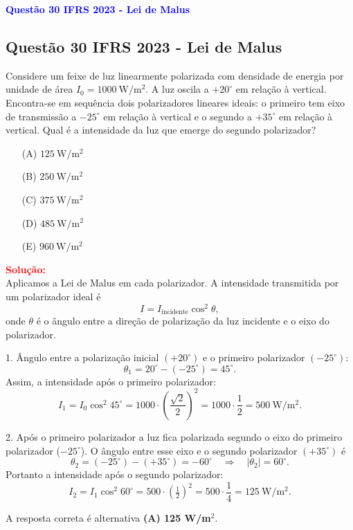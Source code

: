 \begin{flushleft}
\textbf{\textcolor{blue}{\Large Quest\~ao 30 IFRS 2023 - Lei de Malus}}\\
\noindent

\subsection{Quest\~ao 30 IFRS 2023 - Lei de Malus}

Considere um feixe de luz linearmente polarizada com densidade de energia por unidade de área \(I_0=1000\ \mathrm{W/m^2}\). 
A luz oscila a \(+20^\circ\) em relação à vertical. Encontra-se em sequência dois polarizadores lineares ideais: o primeiro 
tem eixo de transmissão a \(-25^\circ\) em relação à vertical e o segundo a \(+35^\circ\) em relação à vertical. Qual é a 
intensidade da luz que emerge do segundo polarizador?

\begin{itemize}
\item[(A)] \(125\ \mathrm{W/m^2}\)
\item[(B)] \(250\ \mathrm{W/m^2}\)
\item[(C)] \(375\ \mathrm{W/m^2}\)
\item[(D)] \(485\ \mathrm{W/m^2}\)
\item[(E)] \(960\ \mathrm{W/m^2}\)
\end{itemize}

\vspace{0.5cm}

\textcolor{red}{\textbf{Solução:}}\\

Aplicamos a Lei de Malus em cada polarizador. A intensidade transmitida por um polarizador ideal é
\[
I = I_{\text{incidente}}\cos^2\theta,
\]
onde \(\theta\) é o ângulo entre a direção de polarização da luz incidente e o eixo do polarizador.

1. Ângulo entre a polarização inicial \((+20^\circ)\) e o primeiro polarizador \((-25^\circ)\):
\[
\theta_1 = 20^\circ - (-25^\circ)=45^\circ.
\]
Assim, a intensidade após o primeiro polarizador:
\[
I_1 = I_0\cos^2 45^\circ = 1000\cdot\left(\frac{\sqrt{2}}{2}\right)^2 = 1000\cdot\frac{1}{2}=500\ \mathrm{W/m^2}.
\]

2. Após o primeiro polarizador a luz fica polarizada segundo o eixo do primeiro polarizador (\(-25^\circ\)). O ângulo entre esse eixo e o segundo polarizador \((+35^\circ)\) é
\[
\theta_2 = (-25^\circ) - (+35^\circ) = -60^\circ \quad\Rightarrow\quad |\theta_2|=60^\circ.
\]
Portanto a intensidade após o segundo polarizador:
\[
I_2 = I_1\cos^2 60^\circ = 500\cdot\left(\tfrac{1}{2}\right)^2 = 500\cdot\frac{1}{4}=125\ \mathrm{W/m^2}.
\]

\vspace{0.3cm}

A resposta correta é alternativa \colorbox{green!50}{\textbf{(A) 125 W/m\(^2\)}}.

\end{flushleft}

